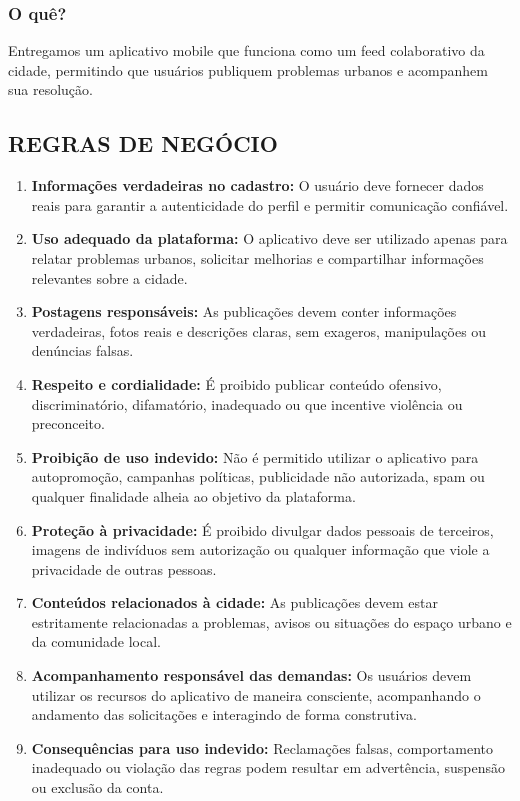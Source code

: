 \subsubsection{O quê?}

Entregamos um aplicativo mobile que funciona como um feed colaborativo da
cidade, permitindo que usuários publiquem problemas urbanos e acompanhem sua
resolução.

\subsection{REGRAS DE NEGÓCIO}

\begin{enumerate}
  \item \textbf{Informações verdadeiras no cadastro:} O usuário deve fornecer dados
        reais para garantir a autenticidade do perfil e permitir comunicação confiável.
  \item \textbf{Uso adequado da plataforma:} O aplicativo deve ser utilizado apenas
        para relatar problemas urbanos, solicitar melhorias e compartilhar informações
        relevantes sobre a cidade.
  \item \textbf{Postagens responsáveis:} As publicações devem conter informações
        verdadeiras, fotos reais e descrições claras, sem exageros, manipulações ou
        denúncias falsas.
  \item \textbf{Respeito e cordialidade:} É proibido publicar conteúdo ofensivo,
        discriminatório, difamatório, inadequado ou que incentive violência ou preconceito.
  \item \textbf{Proibição de uso indevido:} Não é permitido utilizar o aplicativo para
        autopromoção, campanhas políticas, publicidade não autorizada, spam ou qualquer
        finalidade alheia ao objetivo da plataforma.
  \item \textbf{Proteção à privacidade:} É proibido divulgar dados pessoais de
        terceiros, imagens de indivíduos sem autorização ou qualquer informação que
        viole a privacidade de outras pessoas.
  \item \textbf{Conteúdos relacionados à cidade:} As publicações devem estar
        estritamente relacionadas a problemas, avisos ou situações do espaço urbano e
        da comunidade local.
  \item \textbf{Acompanhamento responsável das demandas:} Os usuários devem
        utilizar os recursos do aplicativo de maneira consciente, acompanhando o
        andamento das solicitações e interagindo de forma construtiva.
  \item \textbf{Consequências para uso indevido:} Reclamações falsas, comportamento
        inadequado ou violação das regras podem resultar em advertência, suspensão ou
        exclusão da conta.
\end{enumerate}

